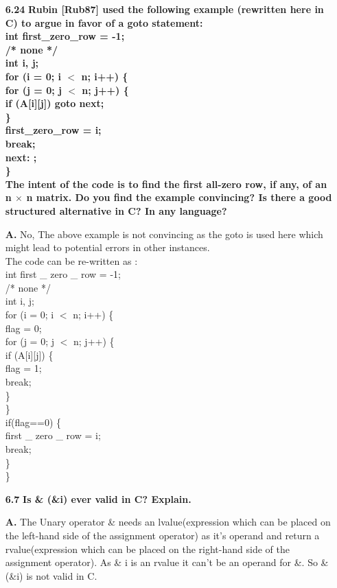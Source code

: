 \documentclass[letterpaper]{article}
\begin{document}
\begin{large}
\begin{flushleft}
\begin{enumerate}
\item[\textbf{6.24}]
\textbf{Rubin [Rub87] used the following example (rewritten here in C) to argue in favor of a goto statement:\\
int first\_zero\_row = -1;\\
/* none */\\
int i, j;\\
for (i = 0; i $<$ n; i++) \{ \\
for (j = 0; j $<$ n; j++) \{ \\
if (A[i][j]) goto next;\\
\} \\
first\_zero\_row = i;\\
break;\\
next: ;\\
\} \\
The intent of the code is to find the first all-zero row, if any, of an n $\times$ n matrix. Do you find the example convincing? Is there a good structured alternative in C? In any language?}
\item[\textbf{A.}]
No, The above example is not convincing as the goto is used here which might lead to potential errors in other instances.\\
The code can be re-written as : \\[0.1in]
int first \_ zero \_ row = -1;\\
/* none */\\
int i, j;\\
for (i = 0; i $<$ n; i++) \{ \\
\quad flag = 0;\\
\quad for (j = 0; j $<$ n; j++) \{ \\
\qquad if (A[i][j]) \{\\
\qquad\quad flag = 1;\\
\qquad\quad break;\\
\qquad \}\\
\quad \}\\
\quad if(flag==0) \{ \\
\quad first \_ zero \_ row = i;\\
\quad break;\\
\quad \} \\
\} \\

\pagebreak

\item[\textbf{6.7}]
\textbf{Is \& (\&i) ever valid in C? Explain.}
\item[\textbf{A.}]
The Unary operator \& needs an lvalue(expression which can be placed on the left-hand side of the assignment operator) as it's operand and return a rvalue(expression which can be placed on the right-hand side of the assignment operator). As \& i is an rvalue it can't be an operand for \&. So \&(\&i) is not valid in C.\\[0.2in]


\end{enumerate}
\end{flushleft}
\end{large}
\end{document}
